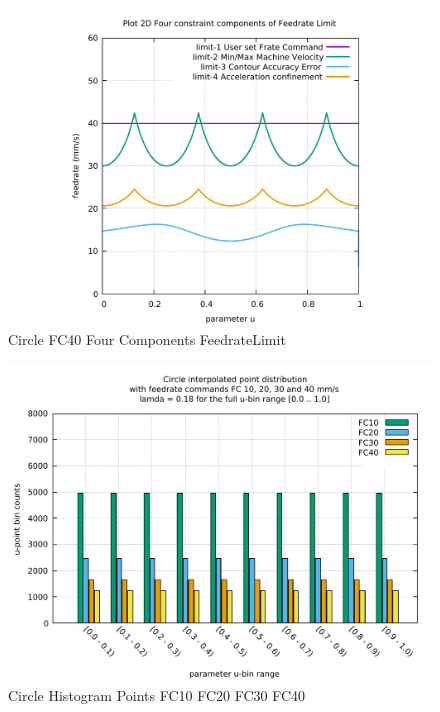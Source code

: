 \begin{figure}
	\caption     {Circle FC40 Four Components FeedrateLimit}
	\label{34-img-Circle-FC40-Four-Components-FeedrateLimit.pdf}
	\includegraphics[width=1.00\textwidth]{Chap4/appendix/app-Circle/plots/34-img-Circle-FC40-Four-Components-FeedrateLimit.pdf}
\end{figure}

\clearpage
\pagebreak

\begin{figure}
	\centering
	\caption     {Circle Histogram Points FC10 FC20 FC30 FC40}
	\label{35-img-Circle-Histogram-Points-FC10-FC20-FC30-FC40.pdf}
	\includegraphics[width=1.00\textwidth]{Chap4/appendix/app-Circle/plots/35-img-Circle-Histogram-Points-FC10-FC20-FC30-FC40.pdf} 
\end{figure}


